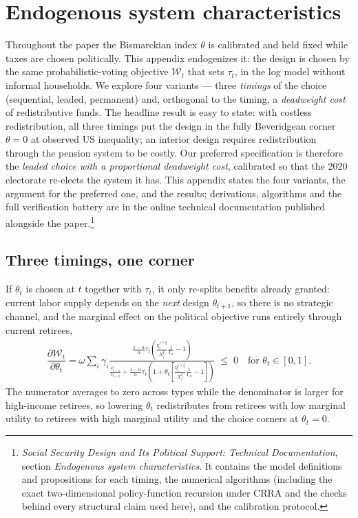 \section{Endogenous system characteristics}\label{app:ESC}\setcounter{equation}{0}
Throughout the paper the Bismarckian index $\theta$ is calibrated and held fixed while taxes are chosen politically. This appendix endogenizes it: the design is chosen by the same probabilistic-voting objective $\mathcal{W}_t$ that sets $\tau_t$, in the log model without informal households. We explore four variants --- three \emph{timings} of the choice (sequential, leaded, permanent) and, orthogonal to the timing, a \emph{deadweight cost} of redistributive funds. The headline result is easy to state: with costless redistribution, all three timings put the design in the fully Beveridgean corner $\theta = 0$ at observed US inequality; an interior design requires redistribution through the pension system to be costly. Our preferred specification is therefore the \emph{leaded choice with a proportional deadweight cost}, calibrated so that the 2020 electorate re-elects the system it has. This appendix states the four variants, the argument for the preferred one, and the results; derivations, algorithms and the full verification battery are in the online technical documentation published alongside the paper.\footnote{\textit{Social Security Design and Its Political Support: Technical Documentation}, section \textit{Endogenous system characteristics}. It contains the model definitions and propositions for each timing, the numerical algorithms (including the exact two-dimensional policy-function recursion under CRRA and the checks behind every structural claim used here), and the calibration protocol.}

\subsection{Three timings, one corner}
 If $\theta_t$ is chosen at $t$ together with $\tau_t$, it only re-splits benefits already granted: current labor supply depends on the \emph{next} design $\theta_{t+1}$, so there is no strategic channel, and the marginal effect on the political objective runs entirely through current retirees,
\begin{align}\label{eq:esc:seqFOC}
   \dfrac{\partial \mathcal{W}_t}{\partial \theta_t} =\omega \sum_i\gamma_i\frac{\frac{1-\alpha}{\alpha}\tau_t\left(\frac{\eta_{i}^{1+\xi}}{X_{i}^{\xi}}\frac{1}{\Gamma_{h}}-1\right)}{\frac{s_{t-1}^i}{s_{t-1}}+\frac{1-\alpha}{\alpha}\tau_t\left(1+\theta_t\left[\frac{\eta_{i}^{1+\xi}}{X_{i}^{\xi}}\frac{1}{\Gamma_{h}}-1\right]\right)}\;\leq\;0 \quad\text{for } \theta_t\in[0,1].
\end{align}
The numerator averages to zero across types while the denominator is larger for high-income retirees, so lowering $\theta_t$ redistributes from retirees with low marginal utility to retirees with high marginal utility and the choice corners at $\theta_t = 0$.

